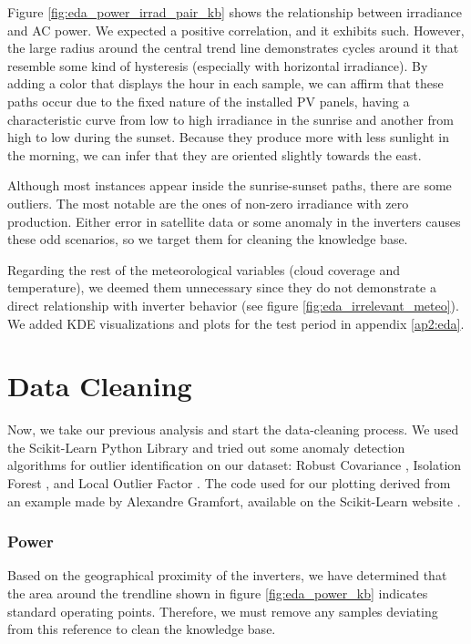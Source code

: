 Figure \ref{fig:eda_power_irrad_pair_kb} shows the relationship between irradiance and AC power. We expected a positive correlation, and it exhibits such. However, the large radius around the central trend line demonstrates cycles around it that resemble some kind of hysteresis (especially with horizontal irradiance). By adding a color that displays the hour in each sample, we can affirm that these paths occur due to the fixed nature of the installed PV panels, having a characteristic curve from low to high irradiance in the sunrise and another from high to low during the sunset. Because they produce more with less sunlight in the morning, we can infer that they are oriented slightly towards the east.

Although most instances appear inside the sunrise-sunset paths, there are some outliers. The most notable are the ones of non-zero irradiance with zero production. Either error in satellite data or some anomaly in the inverters causes these odd scenarios, so we target them for cleaning the knowledge base.

Regarding the rest of the meteorological variables (cloud coverage and temperature), we deemed them unnecessary since they do not demonstrate a direct relationship with inverter behavior (see figure \ref{fig:eda_irrelevant_meteo}). We added KDE visualizations and plots for the test period in appendix \ref{ap2:eda}.

\section{Data Cleaning}

Now, we take our previous analysis and start the data-cleaning process. We used the Scikit-Learn Python Library and tried out some anomaly detection algorithms for outlier identification on our dataset: Robust Covariance \cite{Rousseeuw1999}, Isolation Forest \cite{Liu2008} \cite{Liu2012}, and Local Outlier Factor \cite{Breunig2000}. The code used for our plotting derived from an example made by Alexandre Gramfort, available on the Scikit-Learn website \cite{sklearn_example}.

\subsubsection{Power}

Based on the geographical proximity of the inverters, we have determined that the area around the trendline shown in figure \ref{fig:eda_power_kb} indicates standard operating points. Therefore, we must remove any samples deviating from this reference to clean the knowledge base.

